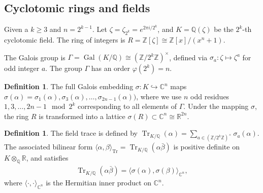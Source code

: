 \documentclass[11pt,a4paper]{article}
\theoremstyle{plain}
\theoremstyle{definition}
\newtheorem{definition}[theorem]{Definition}
\theoremstyle{remark}
\DeclareMathOperator{\Gal}{Gal}
\DeclareMathOperator{\Tr}{Tr}
\newcommand{\Z}{\mathbb{Z}}
\newcommand{\Q}{\mathbb{Q}}
\newcommand{\R}{\mathbb{R}}
\newcommand{\C}{\mathbb{C}}
\begin{document}
\subsection{Cyclotomic rings and fields}

Given a $k\ge 3$ and $n=2^{k-1}$. Let $\zeta=\zeta_{2^k}=e^{2\pi i/2^k}$, and $K=\Q(\zeta)$ be the $2^k$-th cyclotomic field. The ring of integers is $R=\Z[\zeta]\cong \Z[x]/(x^n+1)$.

The Galois group is $\Gamma=\Gal(K/\Q)\cong (\Z/2^k\Z)^\times$, defined via $\sigma_a: \zeta\mapsto\zeta^a$ for odd integer $a$. The group $\Gamma$ has an order $\varphi(2^k)=n$.

\begin{definition}
\label{D:galoisembed}
The full Galois embedding $\sigma:K\hookrightarrow\C^n$ maps $\sigma(\alpha)=\sigma_1(\alpha), \sigma_3(\alpha), \dots, \sigma_{2n-1}(\alpha))$, where we use $n$ odd residues $1, 3, \dots, 2n-1 \mod  2^k$ corresponding to all elements of $\Gamma$. Under the mapping $\sigma$, the ring $R$ is transformed into a lattice $\sigma(R)\subset\C^n\cong\R^{2n}$.

\end{definition}

\begin{definition}
\label{D:trace}
The field trace is defined by $\Tr_{K/\Q}(\alpha)=\sum_{a\in(\Z/2^k\Z)^\times}\sigma_a(\alpha)$. The associated bilinear form $\langle\alpha, \beta\rangle_{\Tr}=\Tr_{K/\Q}(\alpha\bar\beta)$ is positive definite on $K\otimes_\Q\R$, and satisfies
\begin{align}
  \Tr_{K/\Q}(\alpha\bar{\beta})=\langle\sigma(\alpha), \sigma(\beta)\rangle_{\C^n},
  \label{E:traceembed}
\end{align}
where $\langle\cdot, \cdot\rangle_{\C^n}$ is the Hermitian inner product on $\C^n$.
\end{definition}
\end{document}
